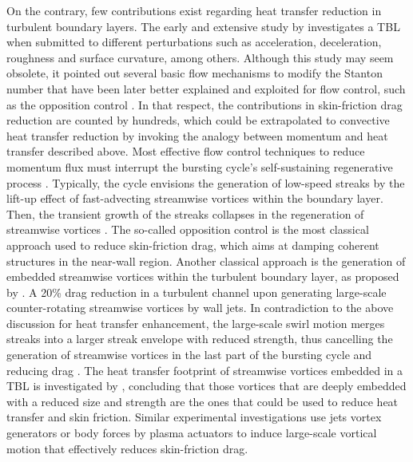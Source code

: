 On the contrary, few contributions exist regarding heat transfer reduction in turbulent boundary layers. The early and extensive study by \citet{Moffat1984review} investigates a TBL when submitted to different perturbations such as acceleration, deceleration, roughness and surface curvature, among others. Although this study may seem obsolete, it pointed out several basic flow mechanisms to modify the Stanton number that have been later better explained and exploited for flow control, such as the opposition control \citep{Choi1994}. In that respect, the contributions in skin-friction drag reduction are counted by hundreds, which could be extrapolated to convective heat transfer reduction by invoking the analogy between momentum and heat transfer described above. Most effective flow control techniques to reduce momentum flux must interrupt the bursting cycle's self-sustaining regenerative process \citep{hamilton1995,Jimenez1999,schoppa2002}. Typically, the cycle envisions the generation of low-speed streaks by the lift-up effect of fast-advecting streamwise vortices \citep{Butler1993streak} within the boundary layer. Then, the transient growth of the streaks collapses in the regeneration of streamwise vortices \citep{hamilton1995,schoppa2002}. The so-called opposition control \citep[\eg][]{Choi1994,Stroh2015,Fukagata2003oppcontrol} is the most classical approach used to reduce skin-friction drag, which aims at damping coherent structures in the near-wall region. Another classical approach is the generation of embedded streamwise vortices within the turbulent boundary layer, as proposed by \citet{Schoppa1998}. A 20\% drag reduction in a turbulent channel upon generating large-scale counter-rotating streamwise vortices by wall jets. In contradiction to the above discussion for heat transfer enhancement, the large-scale swirl motion merges streaks into a larger streak envelope with reduced strength, thus cancelling the generation of streamwise vortices in the last part of the bursting cycle and reducing drag \citep{schoppa2002}. The heat transfer footprint of streamwise vortices embedded in a TBL is investigated by \citet{Zhang1993heatJICF}, concluding that those vortices that are deeply embedded with a reduced size and strength are the ones that could be used to reduce heat transfer and skin friction. Similar experimental investigations use jets vortex generators \citep{iuso2002} or body forces by plasma actuators \citep{cheng_wong_hussain_schroder_zhou_2021} to induce large-scale vortical motion that effectively reduces skin-friction drag.\\


